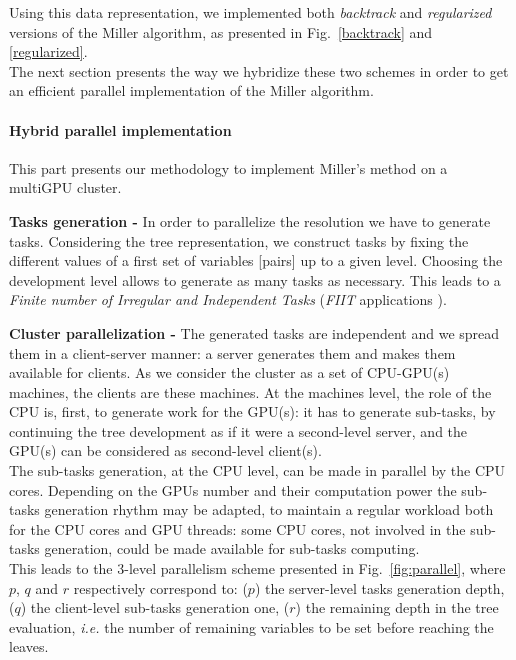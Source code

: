 Using this data representation, 
we implemented both \emph{backtrack} and \emph{regularized} versions of the Miller algorithm, as presented in Fig.~\ref{backtrack} and \ref{regularized}.
\\
The next section presents the way we hybridize these two schemes in order to get an efficient parallel implementation of the Miller algorithm.

\paragraph{Hybrid parallel implementation}
\label{section:parallel_backtrack}
This part presents our methodology to implement Miller's method on a multiGPU cluster.

\textbf{Tasks generation -}
In order to parallelize the resolution we have to generate tasks. 
Considering the tree representation, we construct tasks by fixing the different values of a first set of variables [pairs] up to a given level. Choosing the development level allows to generate as many tasks as necessary. This leads to a \textit{Finite number of Irregular and Independent Tasks} (\emph{FIIT} applications \cite{krajecki1999object}). 

\textbf{Cluster parallelization -} 
The generated tasks are independent and we spread them in a client-server manner: a server generates them and makes them available for clients. As we consider the cluster as a set of CPU-GPU(s) machines, the clients are these machines. 
At the machines level, the role of the CPU is, first, to generate work for the GPU(s): it has to generate sub-tasks, by continuing the tree development as if it were a second-level server, and the GPU(s) can be considered as second-level client(s). \\
The sub-tasks generation, at the CPU level, can be made in parallel by the CPU cores. Depending on the GPUs number and their computation power the sub-tasks generation rhythm may be adapted, to maintain a regular workload both for the CPU cores and GPU threads: some CPU cores, not involved in the sub-tasks generation, could be made available for sub-tasks computing.\\
This leads to the 3-level parallelism scheme presented in Fig.~\ref{fig:parallel}, where $p$, $q$ and $r$ respectively correspond to: ($p$) the server-level tasks generation depth, ($q$) the client-level sub-tasks generation one, ($r$) the remaining depth in the tree evaluation, \textit{i.e.} the number of remaining variables to be set before reaching the leaves.  


